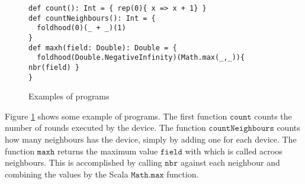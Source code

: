 \begin{figure}[t]
\begin{lstlisting}[language={scafi},frame=single,emph={count, maxh}]
def count(): Int = { rep(0){ x => x + 1} }
def countNeighbours(): Int = {
  foldhood(0)(_ + _)(1)
}
def maxh(field: Double): Double = { 
  foldhood(Double.NegativeInfinity)(Math.max(_,_)){ nbr(field) } 
}
\end{lstlisting}
\caption{Examples of \Scafi{} programs}\label{fig:scafiexample}
\end{figure}

Figure \ref{fig:scafiexample} shows some example of \Scafi{} programs. The first function $\mathtt{count}$ counts the number of rounds executed by the device. The function $\mathtt{countNeighbours}$ counts how many neighbours has the device, simply by adding one for each device. The function $\mathtt{maxh}$ returns the maximum value $\mathtt{field}$ with which is called acroos neighbours. This is accomplished by calling $\mathtt{nbr}$ against each neighbour and combining the values by the Scala $\mathtt{Math.max}$ function.